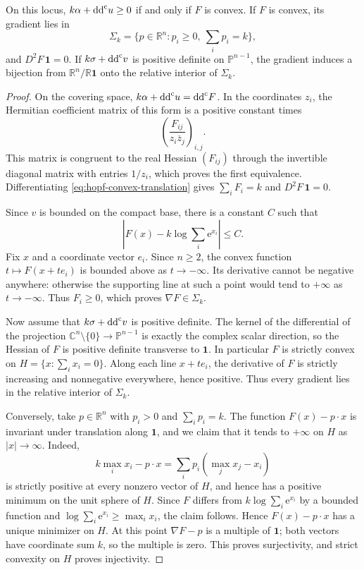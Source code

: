 \begin{proposition}\label{prop:hopf-convex-hyperplane}
On this locus, $k\alpha+\mathrm{dd}^{\mathrm{c}} u\geq0$ if and only if $F$ is convex. If $F$ is convex, its gradient lies in
\[
 \Sigma_k=\{p\in\mathbb R^n:p_i\geq0,\ \textstyle\sum_i p_i=k\},
\]
and $D^2F\,\mathbf1=0$. If $k\sigma+\mathrm{dd}^{\mathrm{c}} v$ is positive definite on $\mathbb P^{n-1}$, the gradient induces a bijection from $\mathbb R^n/\mathbb R\mathbf1$ onto the relative interior of $\Sigma_k$.
\end{proposition}
\begin{proof}
On the covering space, $k\alpha+\mathrm{dd}^{\mathrm{c}} u=\mathrm{dd}^{\mathrm{c}} F$. In the coordinates $z_i$, the Hermitian coefficient matrix of this form is a positive constant times
\[
 \left(\frac{F_{ij}}{z_i\overline z_j}\right)_{i,j}.
\]
This matrix is congruent to the real Hessian $(F_{ij})$ through the invertible diagonal matrix with entries $1/z_i$, which proves the first equivalence. Differentiating \eqref{eq:hopf-convex-translation} gives $\sum_i F_i=k$ and $D^2F\,\mathbf1=0$.

Since $v$ is bounded on the compact base, there is a constant $C$ such that
\[
 \left|F(x)-k\log\sum_i \mathrm{e}^{x_i}\right|\leq C.
\]
Fix $x$ and a coordinate vector $e_i$. Since $n\geq2$, the convex function $t\mapsto F(x+te_i)$ is bounded above as $t\to-\infty$. Its derivative cannot be negative anywhere: otherwise the supporting line at such a point would tend to $+\infty$ as $t\to-\infty$. Thus $F_i\geq0$, which proves $\nabla F\in\Sigma_k$.

Now assume that $k\sigma+\mathrm{dd}^{\mathrm{c}} v$ is positive definite. The kernel of the differential of the projection $\mathbb C^n\setminus\{0\}\to\mathbb P^{n-1}$ is exactly the complex scalar direction, so the Hessian of $F$ is positive definite transverse to $\mathbf1$. In particular $F$ is strictly convex on $H=\{x:\sum_i x_i=0\}$. Along each line $x+te_i$, the derivative of $F$ is strictly increasing and nonnegative everywhere, hence positive. Thus every gradient lies in the relative interior of $\Sigma_k$.

Conversely, take $p\in\mathbb R^n$ with $p_i>0$ and $\sum_i p_i=k$. The function $F(x)-p\cdot x$ is invariant under translation along $\mathbf1$, and we claim that it tends to $+\infty$ on $H$ as $|x|\to\infty$. Indeed,
\[
 k\max_i x_i-p\cdot x
 =\sum_i p_i(\max_j x_j-x_i)
\]
is strictly positive at every nonzero vector of $H$, and hence has a positive minimum on the unit sphere of $H$. Since $F$ differs from $k\log\sum_i \mathrm{e}^{x_i}$ by a bounded function and $\log\sum_i \mathrm{e}^{x_i}\geq\max_i x_i$, the claim follows. Hence $F(x)-p\cdot x$ has a unique minimizer on $H$. At this point $\nabla F-p$ is a multiple of $\mathbf1$; both vectors have coordinate sum $k$, so the multiple is zero. This proves surjectivity, and strict convexity on $H$ proves injectivity.
\end{proof}
